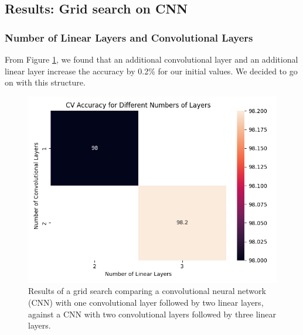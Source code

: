 \newpage
\subsection{Results: Grid search on CNN}
\subsubsection{Number of Linear Layers and Convolutional Layers}
From Figure \ref{fig:cnn:layers}, we found that an additional convolutional layer and an additional linear layer increase the accuracy by 0.2\% for our initial values. We decided to go on with this structure.
\begin{figure}[H]
    \centering
    \includegraphics[width=\textwidth]{results/cnn_grid_search/heatmap_grid_search_layers.png}
    \caption{Results of a grid search comparing a convolutional neural network (CNN) with one convolutional layer followed by two linear layers, against a CNN with two convolutional layers followed by three linear layers.}
    \label{fig:cnn:layers}
\end{figure}

\newpage
